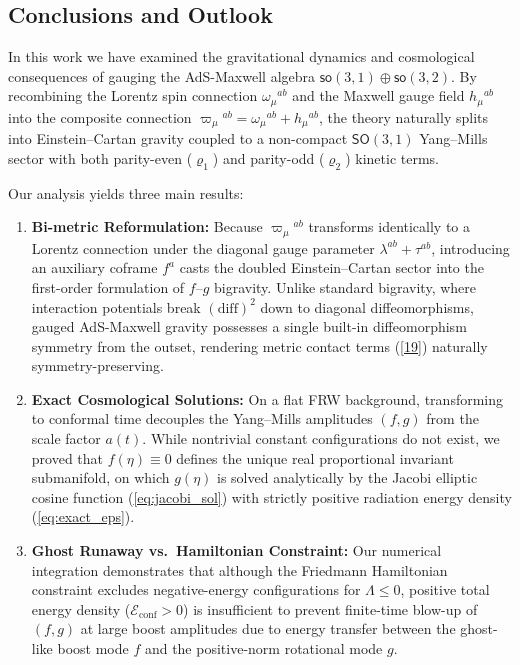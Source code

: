 \documentclass[11pt, a4paper]{article}
\newcommand{\subst}[1]{\textcolor{substantive}{#1}}
\def\SO{\mathsf{SO}}
\def\so{\mathsf{so}}
\begin{document}
\subst{\section{Conclusions and Outlook}\label{sec:conclusions}}

\subst{In this work we have examined the gravitational dynamics and cosmological consequences of gauging the AdS-Maxwell algebra $\so(3,1) \oplus \so(3,2)$. By recombining the Lorentz spin connection $\omega_\mu{}^{ab}$ and the Maxwell gauge field $h_\mu{}^{ab}$ into the composite connection $\varpi_\mu{}^{ab} = \omega_\mu{}^{ab} + h_\mu{}^{ab}$, the theory naturally splits into Einstein--Cartan gravity coupled to a non-compact $\SO(3,1)$ Yang--Mills sector with both parity-even ($\varrho_1$) and parity-odd ($\varrho_2$) kinetic terms.}

\subst{Our analysis yields three main results:}
\begin{enumerate}
\item \subst{\textbf{Bi-metric Reformulation:} Because $\varpi_\mu{}^{ab}$ transforms identically to a Lorentz connection under the diagonal gauge parameter $\lambda^{ab} + \tau^{ab}$, introducing an auxiliary coframe $f^a$ casts the doubled Einstein--Cartan sector into the first-order formulation of $f$--$g$ bigravity. Unlike standard bigravity, where interaction potentials break $(\mathrm{diff})^2$ down to diagonal diffeomorphisms, gauged AdS-Maxwell gravity possesses a single built-in diffeomorphism symmetry from the outset, rendering metric contact terms (\ref{19}) naturally symmetry-preserving.}
\item \subst{\textbf{Exact Cosmological Solutions:} On a flat FRW background, transforming to conformal time decouples the Yang--Mills amplitudes $(f,g)$ from the scale factor $a(t)$. While nontrivial constant configurations do not exist, we proved that $f(\eta) \equiv 0$ defines the unique real proportional invariant submanifold, on which $g(\eta)$ is solved analytically by the Jacobi elliptic cosine function (\ref{eq:jacobi_sol}) with strictly positive radiation energy density (\ref{eq:exact_eps}).}
\item \subst{\textbf{Ghost Runaway vs.\ Hamiltonian Constraint:} Our numerical integration demonstrates that although the Friedmann Hamiltonian constraint excludes negative-energy configurations for $\Lambda \le 0$, positive total energy density ($\mathcal{E}_{\mathrm{conf}} > 0$) is insufficient to prevent finite-time blow-up of $(f,g)$ at large boost amplitudes due to energy transfer between the ghost-like boost mode $f$ and the positive-norm rotational mode $g$.}
\end{enumerate}
\end{document}

